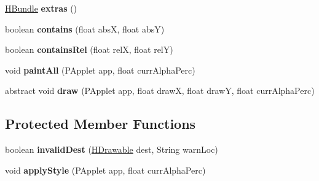 \begin{DoxyCompactItemize}
\item 
\hypertarget{classhype_1_1drawable_1_1_h_drawable_a7505189d57beed823910e448eada428e}{\hyperlink{classhype_1_1util_1_1_h_bundle}{H\-Bundle} {\bfseries extras} ()}\label{classhype_1_1drawable_1_1_h_drawable_a7505189d57beed823910e448eada428e}

\item 
\hypertarget{classhype_1_1drawable_1_1_h_drawable_a6662671b3f2c3f96cdd8883e0eb21fd6}{boolean {\bfseries contains} (float abs\-X, float abs\-Y)}\label{classhype_1_1drawable_1_1_h_drawable_a6662671b3f2c3f96cdd8883e0eb21fd6}

\item 
\hypertarget{classhype_1_1drawable_1_1_h_drawable_a40eaa02f8f52fc6891d77affe8b8f146}{boolean {\bfseries contains\-Rel} (float rel\-X, float rel\-Y)}\label{classhype_1_1drawable_1_1_h_drawable_a40eaa02f8f52fc6891d77affe8b8f146}

\item 
\hypertarget{classhype_1_1drawable_1_1_h_drawable_a56b969fd45ed0e3d217913030f37b9cb}{void {\bfseries paint\-All} (P\-Applet app, float curr\-Alpha\-Perc)}\label{classhype_1_1drawable_1_1_h_drawable_a56b969fd45ed0e3d217913030f37b9cb}

\item 
\hypertarget{classhype_1_1drawable_1_1_h_drawable_a366fdfaa07a6af8055d3b1cc7515dac6}{abstract void {\bfseries draw} (P\-Applet app, float draw\-X, float draw\-Y, float curr\-Alpha\-Perc)}\label{classhype_1_1drawable_1_1_h_drawable_a366fdfaa07a6af8055d3b1cc7515dac6}

\end{DoxyCompactItemize}
\subsection*{Protected Member Functions}
\begin{DoxyCompactItemize}
\item 
\hypertarget{classhype_1_1drawable_1_1_h_drawable_a837e3abd69d85cd63b8e602eeba523d1}{boolean {\bfseries invalid\-Dest} (\hyperlink{classhype_1_1drawable_1_1_h_drawable}{H\-Drawable} dest, String warn\-Loc)}\label{classhype_1_1drawable_1_1_h_drawable_a837e3abd69d85cd63b8e602eeba523d1}

\item 
\hypertarget{classhype_1_1drawable_1_1_h_drawable_a75041e25d5d077971577574277b1b081}{void {\bfseries apply\-Style} (P\-Applet app, float curr\-Alpha\-Perc)}\label{classhype_1_1drawable_1_1_h_drawable_a75041e25d5d077971577574277b1b081}

\end{DoxyCompactItemize}
